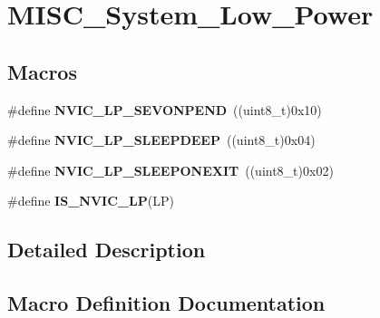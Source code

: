 \hypertarget{group___m_i_s_c___system___low___power}{}\section{M\+I\+S\+C\+\_\+\+System\+\_\+\+Low\+\_\+\+Power}
\label{group___m_i_s_c___system___low___power}
\subsection*{Macros}
\begin{DoxyCompactItemize}
\item 
\hypertarget{group___m_i_s_c___system___low___power_ga10748d2b2875afd122f6476864ad6cae}{}\#define {\bfseries N\+V\+I\+C\+\_\+\+L\+P\+\_\+\+S\+E\+V\+O\+N\+P\+E\+N\+D}~((uint8\+\_\+t)0x10)\label{group___m_i_s_c___system___low___power_ga10748d2b2875afd122f6476864ad6cae}

\item 
\hypertarget{group___m_i_s_c___system___low___power_gaeec2d10922fa9ec5e65398667b303253}{}\#define {\bfseries N\+V\+I\+C\+\_\+\+L\+P\+\_\+\+S\+L\+E\+E\+P\+D\+E\+E\+P}~((uint8\+\_\+t)0x04)\label{group___m_i_s_c___system___low___power_gaeec2d10922fa9ec5e65398667b303253}

\item 
\hypertarget{group___m_i_s_c___system___low___power_ga368dc13a9c762a307c07cfa2e3ef59ad}{}\#define {\bfseries N\+V\+I\+C\+\_\+\+L\+P\+\_\+\+S\+L\+E\+E\+P\+O\+N\+E\+X\+I\+T}~((uint8\+\_\+t)0x02)\label{group___m_i_s_c___system___low___power_ga368dc13a9c762a307c07cfa2e3ef59ad}

\item 
\#define {\bfseries I\+S\+\_\+\+N\+V\+I\+C\+\_\+\+L\+P}(L\+P)
\end{DoxyCompactItemize}


\subsection{Detailed Description}


\subsection{Macro Definition Documentation}
\hypertarget{group___m_i_s_c___system___low___power_ga985896f03bc1d7b3da17a212f1bc3de9}{}
